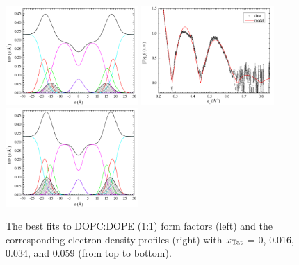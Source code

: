 \begin{figure}[htbp]
  \includegraphics[width=0.45\textwidth,valign=t]{./figures/Tat/SDP_Results/EDP/DOPCDOPE1to1_Tat_28to1_3p0_EDP1}
  \includegraphics[width=0.45\textwidth,valign=t]{figures/Tat/SDP_Results/XFF/DOPCDOPE1to1_Tat_16to1_3p0_XFF1}
  \includegraphics[width=0.45\textwidth,valign=t]{./figures/Tat/SDP_Results/EDP/DOPCDOPE1to1_Tat_16to1_3p0_EDP1}
  \caption{The best fits to DOPC:DOPE (1:1) form factors (left) and the corresponding 
  electron density profiles (right) with $x_\textrm{Tat}$ = 0, 0.016, 0.034, 
  and 0.059 (from top to bottom).}
  \label{fig:DOPCDOPE1to1_Tat_XFF1}
\end{figure}
